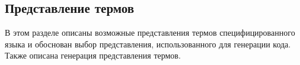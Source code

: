 \subsection{Представление термов}\label{term_repr}
В этом разделе описаны возможные представления термов специфицированного языка и обоснован выбор представления, использованного для генерации кода. Также описана генерация представления термов.







